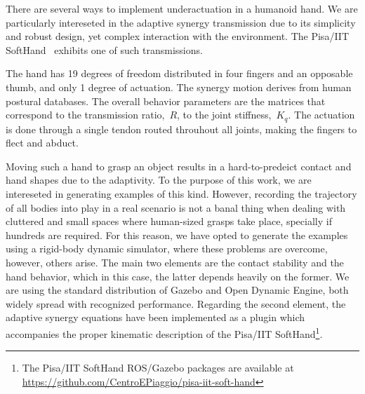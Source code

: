 
There are several ways to implement underactuation in a humanoid hand. We are particularly intereseted in the adaptive synergy transmission due to its simplicity and robust design, yet complex interaction with the environment. The Pisa/IIT SoftHand~\cite{Catalano2014Adaptive} exhibits one of such transmissions.

The hand has 19 degrees of freedom distributed in four fingers and an opposable thumb, and only 1 degree of actuation. The synergy motion derives from human postural databases. The overall behavior parameters are the matrices that correspond to the transmission ratio,~$R$, to the joint stiffness,~$K_q$. The actuation is done through a single tendon routed throuhout all joints, making the fingers to flect and abduct.


Moving such a hand to grasp an object results in a hard-to-predeict contact and hand shapes due to the adaptivity. To the purpose of this work, we are intereseted in generating examples of this kind. However, recording the trajectory of all bodies into play in a real scenario is not a banal thing when dealing with cluttered and small spaces where human-sized grasps take place, specially if hundreds are required. For this reason, we have opted to generate the examples using a rigid-body dynamic simulator, where these problems are overcome, however, others arise. The main two elements are the contact stability and the hand behavior, which in this case, the latter depends heavily on the former. We are using the standard distribution of Gazebo and Open Dynamic Engine, both widely spread with recognized performance.
Regarding the second element, the adaptive synergy equations have been implemented as a plugin which accompanies the proper kinematic description of the Pisa/IIT SoftHand\footnote{The Pisa/IIT SoftHand ROS/Gazebo packages are available at \url{https://github.com/CentroEPiaggio/pisa-iit-soft-hand}}.


